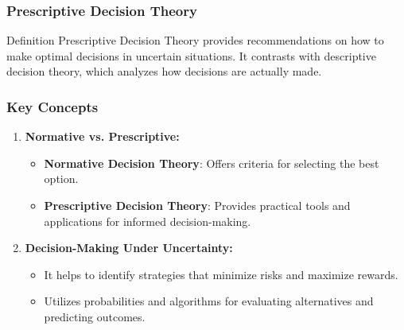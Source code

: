 \documentclass[aspectratio=169]{beamer}
\begin{document}
\begin{frame}[fragile]
    \frametitle{Prescriptive Decision Theory}
    \begin{block}{Definition}
        Prescriptive Decision Theory provides recommendations on how to make optimal decisions in uncertain situations. 
        It contrasts with descriptive decision theory, which analyzes how decisions are actually made.
    \end{block}
\end{frame}

\begin{frame}[fragile]
    \frametitle{Key Concepts}
    \begin{enumerate}
        \item \textbf{Normative vs. Prescriptive:}
            \begin{itemize}
                \item \textbf{Normative Decision Theory}: Offers criteria for selecting the best option. 
                \item \textbf{Prescriptive Decision Theory}: Provides practical tools and applications for informed decision-making.
            \end{itemize}
        \item \textbf{Decision-Making Under Uncertainty:}
            \begin{itemize}
                \item It helps to identify strategies that minimize risks and maximize rewards.
                \item Utilizes probabilities and algorithms for evaluating alternatives and predicting outcomes.
            \end{itemize}
    \end{enumerate}
\end{frame}
\end{document}
